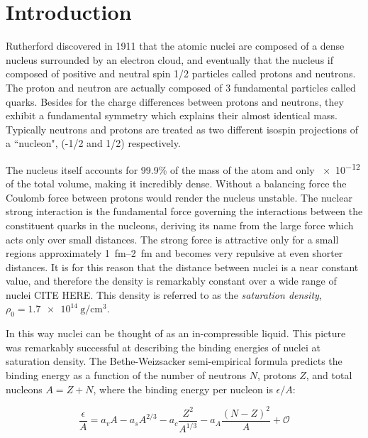 \chapter{Introduction}

Rutherford discovered in 1911 that the atomic nuclei are composed of a dense nucleus surrounded by an electron cloud, and eventually that the nucleus if composed of positive and neutral spin 1/2 particles called protons and neutrons. The proton and neutron are actually composed of 3 fundamental particles called quarks. Besides for the charge differences between protons and neutrons, they exhibit a fundamental symmetry which explains their almost identical mass. Typically neutrons and protons are treated as two different isospin projections of a ``nucleon", (-1/2 and 1/2) respectively.



The nucleus itself accounts for 99.9\% of the mass of the atom and only \num{e-12} of the total volume, making it incredibly dense. Without a balancing force the Coulomb force between protons would render the nucleus unstable. The nuclear strong interaction is the fundamental force governing the interactions between the constituent quarks in the nucleons, deriving its name from the large force which acts only over small distances. The strong force is attractive only for a small regions approximately \SIrange{1}{2}{\femto\metre} and becomes very repulsive at even shorter distances. It is for this reason that the distance between nuclei is a near constant value, and therefore the density is remarkably constant over a wide range of nuclei CITE HERE. This density is referred to as the  \emph{saturation density}, $\rho_0 = \SI{1.7e14}{\gram\per\centi\metre\cubed}$.  

 In this way nuclei can be thought of as an in-compressible liquid. This picture was remarkably successful at describing the binding energies of nuclei at saturation density. The Bethe-Weizsacker semi-empirical formula predicts the binding energy as a function of the number of neutrons $N$, protons $Z$, and total nucleons $A = Z + N$, where the binding energy per nucleon is $\epsilon/A$:
 
\begin{equation}
\frac{\epsilon}{A} = a_vA - a_s A^{2/3} - a_c \frac{Z^2}{A^{1/3}} - a_A\frac{(N - Z)^2}{A} + \mathcal{O}
\label{eq:semiEmp}
\end{equation}

